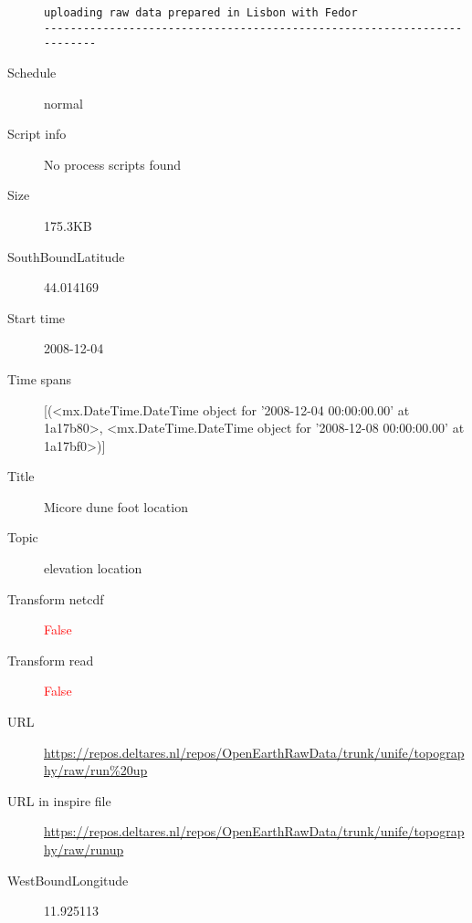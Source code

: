\documentclass[9]{report}
\begin{document}
\begin{description}
\begin{verbatim}
uploading raw data prepared in Lisbon with Fedor
------------------------------------------------------------------------

\end{verbatim}
  \item[Schedule] normal
  \item[Script info] No process scripts found
  \item[Size] 175.3KB
  \item[SouthBoundLatitude] 44.014169
  \item[Start time] 2008-12-04
  \item[Time spans] [(<mx.DateTime.DateTime object for '2008-12-04 00:00:00.00' at 1a17b80>, <mx.DateTime.DateTime object for '2008-12-08 00:00:00.00' at 1a17bf0>)]
  \item[Title]  Micore dune foot location 
  \item[Topic] elevation location
  \item[Transform netcdf] \textcolor{red}{False}
  \item[Transform read] \textcolor{red}{False}
  \item[URL] \href{https://repos.deltares.nl/repos/OpenEarthRawData/trunk/unife/topography/raw/run\%20up}{https://repos.deltares.nl/repos/OpenEarthRawData/trunk/unife/topography/raw/run\%20up}
  \item[URL in inspire file] \href{https://repos.deltares.nl/repos/OpenEarthRawData/trunk/unife/topography/raw/runup}{https://repos.deltares.nl/repos/OpenEarthRawData/trunk/unife/topography/raw/runup}
  \item[WestBoundLongitude] 11.925113
\end{description}
\end{document}
